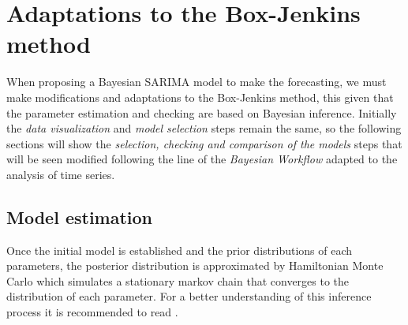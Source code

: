 \section{Adaptations to the Box-Jenkins method}
When proposing a Bayesian SARIMA model to make the forecasting, we must make modifications and adaptations to the Box-Jenkins method, this given that the parameter estimation and checking are based on Bayesian inference. Initially the \textit{data visualization} and \textit{model selection} steps remain the same, so the following sections will show the \textit{selection, checking and comparison of the models} steps that will be seen modified following the line of the \textit{Bayesian Workflow} adapted to the analysis of time series.
%
\subsection{Model estimation}
Once the initial model is established and the prior distributions of each parameters, the posterior distribution is approximated by Hamiltonian Monte Carlo which simulates a stationary markov chain that converges to the distribution of each parameter. For a better understanding of this inference process it is recommended to read \cite{BDA}.
%
